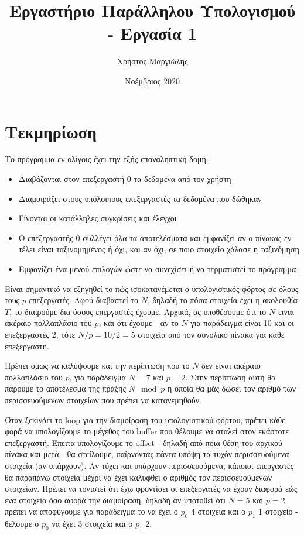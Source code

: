 \documentclass{article}
\title{Εργαστήριο Παράλληλου Υπολογισμού - Εργασία 1}
\author{Χρήστος Μαργιώλης}
\date{Νοέμβριος 2020}
\begin{document}
\begin{titlepage}
    \maketitle
\end{titlepage}

\renewcommand{\contentsname}{Περιεχόμενα}
\tableofcontents

\section{Τεκμηρίωση}
Το πρόγραμμα εν ολίγοις έχει την εξής επαναληπτική δομή:
\begin{itemize}
        \item Διαβάζονται στον επεξεργαστή 0 τα δεδομένα από τον χρήστη
        \item Διαμοιράζει στους υπόλοιπους επεξεργαστές τα δεδομένα που δώθηκαν
        \item Γίνονται οι κατάλληλες συγκρίσεις και έλεγχοι
        \item Ο επεξεργαστής 0 συλλέγει όλα τα αποτελέσματα και εμφανίζει
                αν ο πίνακας εν τέλει είναι ταξινομημένος ή όχι, και αν όχι, σε
                ποιο στοιχείο χάλασε η ταξινόμηση
        \item Εμφανίζει ένα μενού επιλογών ώστε να συνεχίσει ή να τερματιστεί το
                πρόγραμμα
\end{itemize}

Είναι σημαντικό να εξηγηθεί το πώς ισοκατανέμεται ο υπολογιστικός φόρτος σε όλους
τους $p$ επεξεργατές. Αφού διαβαστεί το $N$, δηλαδή το πόσα στοιχεία
έχει η ακολουθία $T$, το διαιρούμε δια όσους επεργαστές έχουμε. Αρχικά, ας
υποθέσουμε ότι το $N$ ειναι ακέραιο πολλαπλάσιο του $p$, και ότι
έχουμε - αν το $N$ για παράδειγμα είναι 10 και οι επεξεργαστές 2, τότε
$N / p = 10 / 2 = 5$ στοιχεία από τον συνολικό πίνακα για κάθε επεξεργαστή.

Πρέπει όμως να καλύψουμε και την περίπτωση που το $N$ δεν είναι ακέραιο πολλαπλάσιο του
$p$, για παράδειγμα $N = 7$ και $p = 2$. Στην περίπτωση αυτή θα πάρουμε το αποτέλεσμα
της πράξης $N \mod p$ η οποία θα μάς δώσει τον αριθμό των περισσευούμενων στοιχείων που
πρέπει να κατανεμηθούν.

Όταν ξεκινάει το loop για την διαμοίραση του υπολογιστικού φόρτου, πρέπει κάθε φορά
να υπολογίζουμε το μέγεθος του buffer που θέλουμε να σταλεί στον εκάστοτε επεξεργαστή.
Έπειτα υπολογίζουμε το offset - δηλαδή από ποιά θέση του αρχικού πίνακα και μετά - θα 
στείλουμε, παίρνοντας πάντα υπόψη τα τυχόν περισσευούμενα στοιχεία (αν υπάρχουν). Αν τύχει
και υπάρχουν περισσευούμενα, κάποιοι επεργαστές θα παραπάνω στοιχεία μέχρι να έχει
καλυφθεί ο αριθμός τον περισσευούμενων στοιχείων. Πρέπει να τονιστεί ότι έχω φροντίσει
οι επεξεργατές να έχουν διαφορά εώς ενα στοιχείο όσο αφορά την διαμοίραση, δηλαδή
αν υποτοθεί ότι $N = 5$ και $p = 2$ πρέπει να αποφύγουμε για παράδειγμα το να έχει
ο $p_0$ 4 στοιχεία και ο $p_1$ 1 στοιχείο - θέλουμε ο $p_0$ να έχει 3 στοιχεία
και ο $p_1$ 2.
\end{document}
